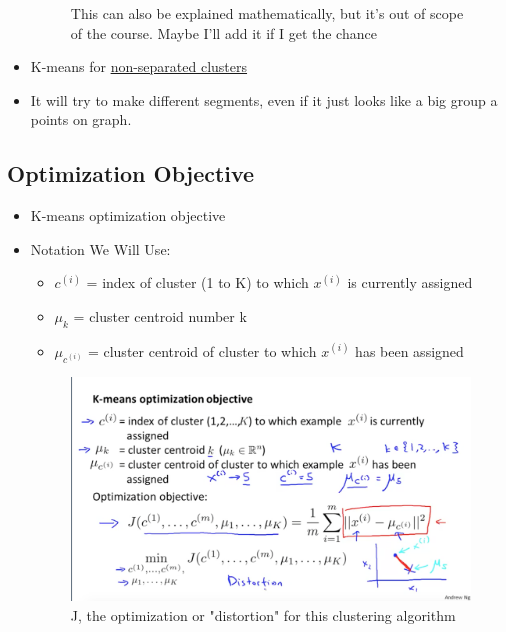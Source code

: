 \documentclass[]{article}
\begin{document}
\begin{itemize}
\begin{figure}[ht!]
				\caption{This can also be explained mathematically, but it's out of scope of the course. Maybe I'll add it if I get the chance}
			\end{figure}
			\item K-means for \underline{non-separated clusters}
			\item It will try to make different segments, even if it just looks like a big group a points on graph.
		\end{itemize}
		
	\subsection{Optimization Objective}
		\begin{itemize}
			\item K-means optimization objective
			\item Notation We Will Use:
			\begin{itemize}
				\item $c^{(i)}$ = index of cluster (1 to K) to which $x^{(i)}$ is currently assigned
				\item $\mu_{k}$ = cluster centroid number k
				\item $\mu_{c^{(i)}}$ = cluster centroid of cluster to which $x^{(i)}$ has been assigned
			\end{itemize}
			\begin{figure}[ht!]
				\includegraphics[width= 1.5\textwidth,center]{K-means_Optimization.png}
				\caption{J, the optimization or "distortion" for this clustering algorithm}
			\end{figure}
		\end{itemize}
		
\end{document}
